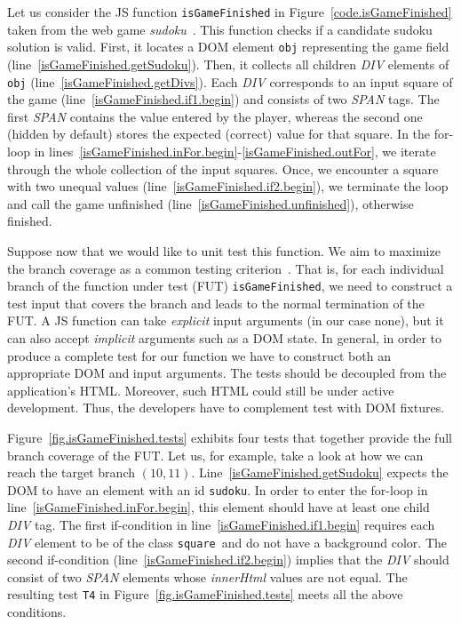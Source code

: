 Let us consider the JS function \texttt{isGameFinished} in Figure~\ref{code.isGameFinished} taken from the web game \emph{sudoku}~\cite{sudoku}. This function checks if a candidate sudoku solution is valid. First, it locates a DOM element \texttt{obj} representing the game field (line~\ref{isGameFinished.getSudoku}). Then, it collects all children \emph{DIV} elements of \texttt{obj} (line~\ref{isGameFinished.getDivs}). Each \emph{DIV} corresponds to an input square of the game (line~\ref{isGameFinished.if1.begin}) and consists of two \emph{SPAN} tags. The first \emph{SPAN} contains the value entered by the player, whereas the second one (hidden by default) stores the expected (correct) value for that square. In the for-loop in lines~\ref{isGameFinished.inFor.begin}-\ref{isGameFinished.outFor}, we iterate through the whole collection of the input squares. Once, we encounter a square with two unequal values (line~\ref{isGameFinished.if2.begin}), we terminate the loop and call the game unfinished (line~\ref{isGameFinished.unfinished}), otherwise finished.

Suppose now that we would like to unit test this function. We aim to maximize the branch coverage as a common testing criterion~\cite{zhu1997software}. That is, for each individual branch of the function under test (FUT) \texttt{isGameFinished}, we need to construct a test input that covers the branch and leads to the normal termination of the FUT. A JS function can take \emph{explicit} input arguments (in our case none), but it can also accept \emph{implicit} arguments such as a DOM state. In general, in order to produce a complete test for our function we have to construct both an appropriate DOM and input arguments. The tests should be decoupled from the application's HTML. Moreover, such HTML could still be under active development. Thus, the developers have to complement test with DOM fixtures.


Figure~\ref{fig.isGameFinished.tests} exhibits four tests that together provide the full branch coverage of the FUT. Let us, for example, take a look at how we can reach the target branch $(10,11)$. Line~\ref{isGameFinished.getSudoku} expects the DOM to have an element with an id \textquotesingle\texttt{sudoku}\textquotesingle. In order to enter the for-loop in line~\ref{isGameFinished.inFor.begin}, this element should have at least one child \emph{DIV} tag. The first if-condition in line~\ref{isGameFinished.if1.begin} requires each \emph{DIV} element to be of the class \textquotesingle\texttt{square}\textquotesingle\, and do not have a background color. The second if-condition (line~\ref{isGameFinished.if2.begin}) implies that the \emph{DIV} should consist of two \emph{SPAN} elements whose \emph{innerHtml} values are not equal. The resulting test \texttt{T4} in Figure~\ref{fig.isGameFinished.tests} meets all the above conditions.

